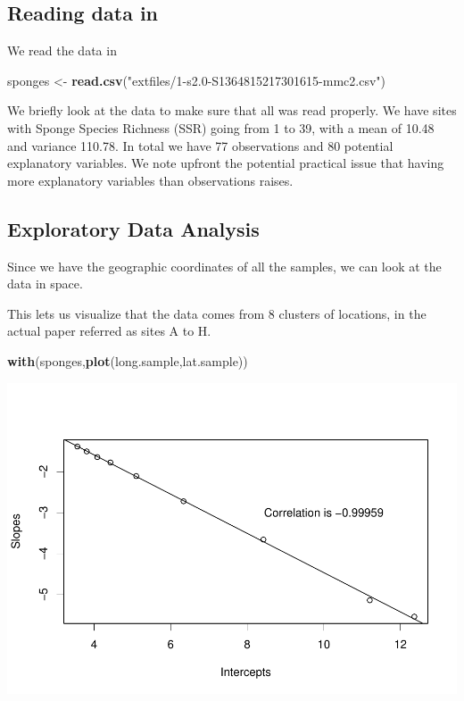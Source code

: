 \documentclass[
]{book}
\newenvironment{Shaded}{\begin{snugshade}}{\end{snugshade}}
\newcommand{\FunctionTok}[1]{\textcolor[rgb]{0.13,0.29,0.53}{\textbf{#1}}}
\newcommand{\NormalTok}[1]{#1}
\newcommand{\OtherTok}[1]{\textcolor[rgb]{0.56,0.35,0.01}{#1}}
\newcommand{\StringTok}[1]{\textcolor[rgb]{0.31,0.60,0.02}{#1}}
\begin{document}
\hypertarget{reading-data-in}{%
\subsection{Reading data in}\label{reading-data-in}}

We read the data in

\begin{Shaded}
\begin{Highlighting}[]
\NormalTok{sponges }\OtherTok{\textless{}{-}} \FunctionTok{read.csv}\NormalTok{(}\StringTok{"extfiles/1{-}s2.0{-}S1364815217301615{-}mmc2.csv"}\NormalTok{)}
\end{Highlighting}
\end{Shaded}

We briefly look at the data to make sure that all was read properly. We have sites with Sponge Species Richness (SSR) going from 1 to 39, with a mean of 10.48 and variance 110.78. In total we have 77 observations and 80 potential explanatory variables. We note upfront the potential practical issue that having more explanatory variables than observations raises.

\hypertarget{exploratory-data-analysis}{%
\subsection{Exploratory Data Analysis}\label{exploratory-data-analysis}}

Since we have the geographic coordinates of all the samples, we can look at the data in space.

This lets us visualize that the data comes from 8 clusters of locations, in the actual paper referred as sites A to H.

\begin{Shaded}
\begin{Highlighting}[]
\FunctionTok{with}\NormalTok{(sponges,}\FunctionTok{plot}\NormalTok{(long.sample,lat.sample)) }
\end{Highlighting}
\end{Shaded}

\includegraphics{ECOMODbook_files/figure-latex/unnamed-chunk-66-1.pdf}
\end{document}
